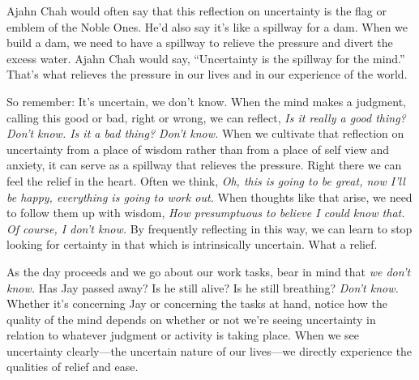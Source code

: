 Ajahn Chah would often say that this reflection on uncertainty is the 
flag or emblem of the Noble Ones. He'd also say it's like a spillway 
for a dam. When we build a dam, we need to have a spillway to relieve 
the pressure and divert the excess water. Ajahn Chah would say, 
``Uncertainty is the spillway for the mind.'' That's what relieves the 
pressure in our lives and in our experience of the world.

So remember: It's uncertain, we don't know. When the mind makes a 
judgment, calling this good or bad, right or wrong, we can reflect, 
\emph{Is it really a good thing? Don't know. Is it a bad thing? Don't 
know.} When we cultivate that reflection on uncertainty from a place of 
wisdom rather than from a place of self view and anxiety, it can serve 
as a spillway that relieves the pressure. Right there we can feel the 
relief in the heart. Often we think, \emph{Oh, this is going to be 
great, now I'll be happy, everything is going to work out.} When 
thoughts like that arise, we need to follow them up with wisdom, 
\emph{How presumptuous to believe I could know that. Of course, I don't 
know.} By frequently reflecting in this way, we can learn to stop 
looking for certainty in that which is intrinsically uncertain. What a 
relief.

As the day proceeds and we go about our work tasks, bear in mind that 
\emph{we don't know.} Has Jay passed away? Is he still alive? Is he 
still breathing? \emph{Don't know.} Whether it's concerning Jay or 
concerning the tasks at hand, notice how the quality of the mind 
depends on whether or not we're seeing uncertainty in relation to 
whatever judgment or activity is taking place. When we see uncertainty 
clearly---the uncertain nature of our lives---we directly experience 
the qualities of relief and ease.

